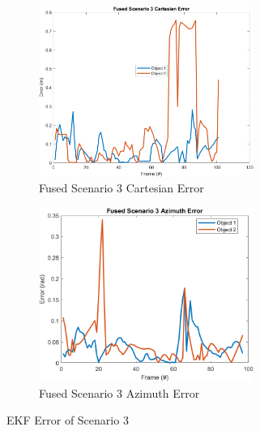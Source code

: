 \begin{figure}[!htb]
    \hspace{0.1\textwidth}
    \begin{subfigure}[b]{0.3\textwidth}%
        \includegraphics[width=7cm]{Figures/matlab/Fused Scenario 3 Cartesian Error.png}
        \caption{Fused Scenario 3 Cartesian Error}
        \label{subfig:err_cart_3}
    \end{subfigure}
    \hspace{0.15\textwidth}
    \begin{subfigure}[b]{0.3\textwidth}%
        \includegraphics[width=7cm]{Figures/matlab/Fused Scenario 3 Azimuth Error.png}
        \caption{Fused Scenario 3 Azimuth Error}
        \label{subfig:err_azi_3}
    \end{subfigure}

    \caption{EKF Error of Scenario 3}
    \label{fig:error_3}
\end{figure}
\newpage



